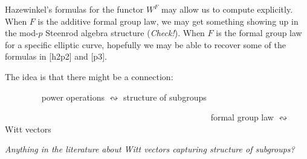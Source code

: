 \documentclass{rs}
\theoremstyle{definition}
\theoremstyle{remark}
\renewcommand{\=}{\approx}
\renewcommand{\-}{\sim}
\numberwithin{equation}{section}
\numberwithin{thm}{section}
\begin{document}
Hazewinkel's formulas for the functor $W^F$ may allow us to compute explicitly. 
When $F$ is the additive formal group law, we may get something showing up in the mod-$p$ Steenrod algebra structure ({\em Check!}). 
When $F$ is the formal group law for a specific elliptic curve, hopefully we may be able to recover some of the formulas in [h2p2] and [p3].

The idea is that there might be a connection:

~~~~~~~~ power operations $\leftrightsquigarrow$ structure of subgroups

~~~~~~~~~~~~~~~~~~~~~~~~~~~~~~~~~~~~~~~~~~~~~~~~ formal group law $\leftrightsquigarrow$ Witt vectors

{\em Anything in the literature about Witt vectors capturing structure of subgroups?}
\end{document}
